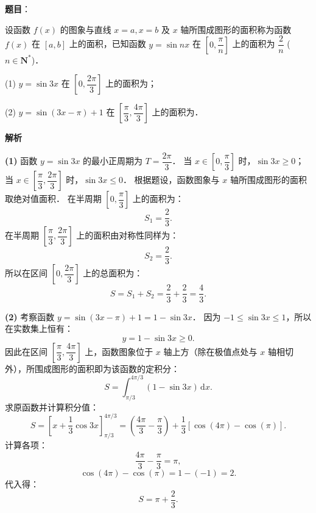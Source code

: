 \begin{answer}

\textbf{题目}：

设函数 $f(x)$ 的图象与直线 $x = a, x = b$ 及 $x$ 轴所围成图形的面积称为函数 $f(x)$ 在 $[a, b]$ 上的面积，已知函数 $y = \sin nx$ 在 $\left[0, \dfrac{\pi}{n}\right]$ 上的面积为 $\dfrac{2}{n}$ ($n \in \mathbf{N}^*$)．

(1) $y = \sin 3x$ 在 $\left[0, \dfrac{2\pi}{3}\right]$ 上的面积为\gkblank{}；

(2) $y = \sin(3x - \pi) + 1$ 在 $\left[\dfrac{\pi}{3}, \dfrac{4\pi}{3}\right]$ 上的面积为\gkblank{}．

\textbf{解析}

\textbf{(1)}
函数 $y = \sin 3x$ 的最小正周期为 $T = \dfrac{2\pi}{3}$．
当 $x \in \left[0, \dfrac{\pi}{3}\right]$ 时，$\sin 3x \geqslant 0$；
当 $x \in \left[\dfrac{\pi}{3}, \dfrac{2\pi}{3}\right]$ 时，$\sin 3x \leqslant 0$．
根据题设，函数图象与 $x$ 轴所围成图形的面积取绝对值面积．
在半周期 $\left[0, \dfrac{\pi}{3}\right]$ 上的面积为：
\nopagebreak[4]
\[
S_1 = \frac{2}{3}.
\]
在半周期 $\left[\dfrac{\pi}{3}, \dfrac{2\pi}{3}\right]$ 上的面积由对称性同样为：
\nopagebreak[4]
\[
S_2 = \frac{2}{3}.
\]
所以在区间 $\left[0, \dfrac{2\pi}{3}\right]$ 上的总面积为：
\nopagebreak[4]
\[
S = S_1 + S_2 = \frac{2}{3} + \frac{2}{3} = \frac{4}{3}.
\]

\textbf{(2)}
考察函数 $y = \sin(3x - \pi) + 1 = 1 - \sin 3x$．
因为 $-1 \leqslant \sin 3x \leqslant 1$，所以在实数集上恒有：
\nopagebreak[4]
\[
y = 1 - \sin 3x \geqslant 0.
\]
因此在区间 $\left[\dfrac{\pi}{3}, \dfrac{4\pi}{3}\right]$ 上，函数图象位于 $x$ 轴上方（除在极值点处与 $x$ 轴相切外），所围成图形的面积即为该函数的定积分：
\nopagebreak[4]
\[
S = \int_{\pi/3}^{4\pi/3} (1 - \sin 3x)\,\mathrm{d}x.
\]
求原函数并计算积分值：
\nopagebreak[4]
\[
S = \left[x + \frac{1}{3}\cos 3x\right]_{\pi/3}^{4\pi/3} = \left(\frac{4\pi}{3} - \frac{\pi}{3}\right) + \frac{1}{3}\left[\cos(4\pi) - \cos(\pi)\right].
\]
计算各项：
\nopagebreak[4]
\[
\frac{4\pi}{3} - \frac{\pi}{3} = \pi,
\]
\nopagebreak[4]
\[
\cos(4\pi) - \cos(\pi) = 1 - (-1) = 2.
\]
代入得：
\nopagebreak[4]
\[
S = \pi + \frac{2}{3}.
\]



\end{answer}

